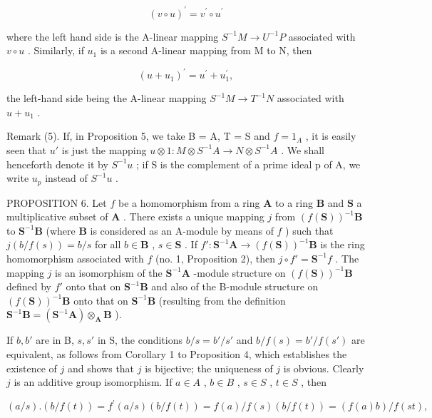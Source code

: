 \[
(v \circ u) ^ {\prime} = v ^ {\prime} \circ u ^ {\prime}\tag{7}
\]

where the left hand side is the A-linear mapping \(S^{-1}M \rightarrow U^{-1}P\) associated with \(v \circ u\) . Similarly, if \(u_{1}\) is a second A-linear mapping from M to N, then

\[
(u + u _ {1}) ^ {\prime} = u ^ {\prime} + u _ {1} ^ {\prime},\tag{8}
\]

the left-hand side being the A-linear mapping \(S^{-1}M \rightarrow T^{-1}N\) associated with \(u + u_{1}\) .

Remark (5). If, in Proposition 5, we take B = A, T = S and \(f = 1_{A}\) , it is easily seen that \(u'\) is just the mapping \(u \otimes 1: M \otimes S^{-1}A \to N \otimes S^{-1}A\) . We shall henceforth denote it by \(S^{-1}u\) ; if S is the complement of a prime ideal p of A, we write \(u_{p}\) instead of \(S^{-1}u\) .

PROPOSITION 6. Let \(f\) be a homomorphism from a ring \(\mathbf{A}\) to a ring \(\mathbf{B}\) and \(\mathbf{S}\) a multiplicative subset of \(\mathbf{A}\) . There exists a unique mapping \(j\) from \((f(\mathbf{S}))^{-1}\mathbf{B}\) to \(\mathbf{S}^{-1}\mathbf{B}\) (where \(\mathbf{B}\) is considered as an A-module by means of \(f\) ) such that \(j(b/f(s)) = b/s\) for all \(b \in \mathbf{B}\) , \(s \in \mathbf{S}\) . If \(f': \mathbf{S}^{-1}\mathbf{A} \to (f(\mathbf{S}))^{-1}\mathbf{B}\) is the ring homomorphism associated with \(f\) (no. 1, Proposition 2), then \(j \circ f' = \mathbf{S}^{-1}f\) . The mapping \(j\) is an isomorphism of the \(\mathbf{S}^{-1}\mathbf{A}\) -module structure on \((f(\mathbf{S}))^{-1}\mathbf{B}\) defined by \(f'\) onto that on \(\mathbf{S}^{-1}\mathbf{B}\) and also of the B-module structure on \((f(\mathbf{S}))^{-1}\mathbf{B}\) onto that on \(\mathbf{S}^{-1}\mathbf{B}\) (resulting from the definition \(\mathbf{S}^{-1}\mathbf{B} = (\mathbf{S}^{-1}\mathbf{A}) \otimes_{\mathbf{A}} \mathbf{B}\) ).

If \(b, b'\) are in B, \(s, s'\) in S, the conditions \(b / s = b' / s'\) and \(b / f(s) = b' / f(s')\) are equivalent, as follows from Corollary 1 to Proposition 4, which establishes the existence of \(j\) and shows that \(j\) is bijective; the uniqueness of \(j\) is obvious. Clearly \(j\) is an additive group isomorphism. If \(a \in A\) , \(b \in B\) , \(s \in S\) , \(t \in S\) , then

\[
(a / s). (b / f (t)) = f ^ {\prime} (a / s) (b / f (t)) = f (a) / f (s) (b / f (t)) = (f (a) b) / f (s t),
\]

